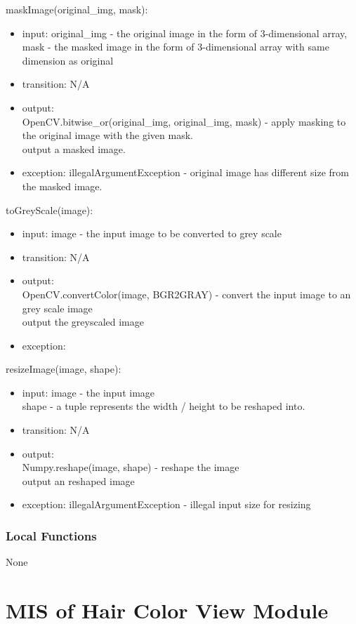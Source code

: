 \documentclass[12pt, titlepage]{article}
\begin{document}
\noindent maskImage(original\_img, mask):
\begin{itemize}
\item input: original\_img - the original image in the form of 3-dimensional array, mask - the masked image in the form of 3-dimensional array with same dimension as original
\item transition: N/A
\item output: \\
OpenCV.bitwise\_or(original\_img, original\_img, mask) - apply masking to the original image with the given mask. \\
output a masked image.
\item exception: illegalArgumentException - original image has different size from the masked image.
\end{itemize}

\noindent toGreyScale(image):
\begin{itemize}
\item input: image - the input image to be converted to grey scale
\item transition: N/A
\item output: \\
OpenCV.convertColor(image, BGR2GRAY) - convert the input image to an grey scale image \\
output the greyscaled image
\item exception: 
\end{itemize}

\noindent resizeImage(image, shape):
\begin{itemize}
\item input: image - the input image \\
shape - a tuple represents the width / height to be reshaped into.
\item transition: N/A
\item output: \\
Numpy.reshape(image, shape) - reshape the image \\
output an reshaped image 
\item exception: illegalArgumentException - illegal input size for resizing
\end{itemize}

\subsubsection{Local Functions}
None

\newpage
\section{MIS of Hair Color View Module} \label{Module} 
\end{document}
